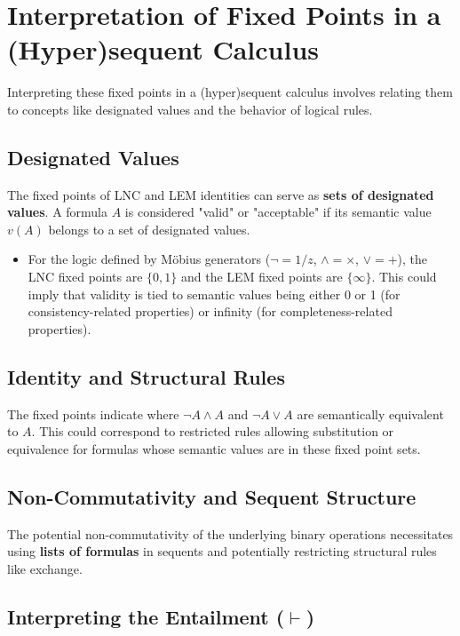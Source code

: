 	\section{Interpretation of Fixed Points in a (Hyper)sequent Calculus}
	
	Interpreting these fixed points in a (hyper)sequent calculus involves relating them to concepts like designated values and the behavior of logical rules.
	
	\subsection{Designated Values}
	
	The fixed points of LNC and LEM identities can serve as \textbf{sets of designated values}. A formula $A$ is considered "valid" or "acceptable" if its semantic value $v(A)$ belongs to a set of designated values.
	
	\begin{itemize}
		\item For the logic defined by M\"{o}bius generators ($\neg=1/z$, $\wedge=\times$, $\vee=+$), the LNC fixed points are $\{0, 1\}$ and the LEM fixed points are $\{\infty\}$. This could imply that validity is tied to semantic values being either 0 or 1 (for consistency-related properties) or infinity (for completeness-related properties).
	\end{itemize}
	
	\subsection{Identity and Structural Rules}
	
	The fixed points indicate where $\neg A \wedge A$ and $\neg A \vee A$ are semantically equivalent to $A$. This could correspond to restricted rules allowing substitution or equivalence for formulas whose semantic values are in these fixed point sets.
	
	\subsection{Non-Commutativity and Sequent Structure}
	
	The potential non-commutativity of the underlying binary operations necessitates using \textbf{lists of formulas} in sequents and potentially restricting structural rules like exchange.
	
	\subsection{Interpreting the Entailment ($\vdash$)}
	

